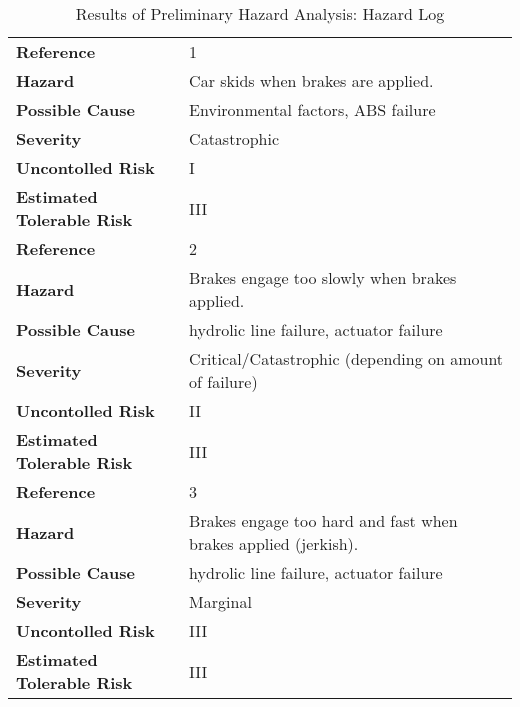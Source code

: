 \documentclass{article}
\begin{document}
\begin{table}[h!tbp]
\begin{center}
\begin{tabular}{|l|l|}
\hline
\textbf{Reference}&		1\\
\textbf{Hazard}&	Car skids when brakes are applied.\\
\textbf{Possible Cause}&	Environmental factors, ABS failure\\
\textbf{Severity}&	Catastrophic\\
\textbf{Uncontolled Risk}&	I\\
\textbf{Estimated Tolerable Risk}&	III\\
\hline
\hline
\textbf{Reference}&		2\\
\textbf{Hazard}&	Brakes engage too slowly when brakes applied.\\
\textbf{Possible Cause}&	hydrolic line failure, actuator failure\\
\textbf{Severity}&	Critical/Catastrophic (depending on amount of failure)\\
\textbf{Uncontolled Risk}&	II\\
\textbf{Estimated Tolerable Risk}&	III\\
\hline
\hline
\textbf{Reference}&		3\\
\textbf{Hazard}&Brakes engage too hard and fast when brakes applied (jerkish).\\
\textbf{Possible Cause}&	hydrolic line failure, actuator failure\\
\textbf{Severity}&	Marginal\\
\textbf{Uncontolled Risk}&	III\\
\textbf{Estimated Tolerable Risk}&	III\\
\hline
\end{tabular}
\end{center}
\caption{Results of Preliminary Hazard Analysis: Hazard Log}
\label{fig:HazardLogTable1}
\end{table}
\end{document}
